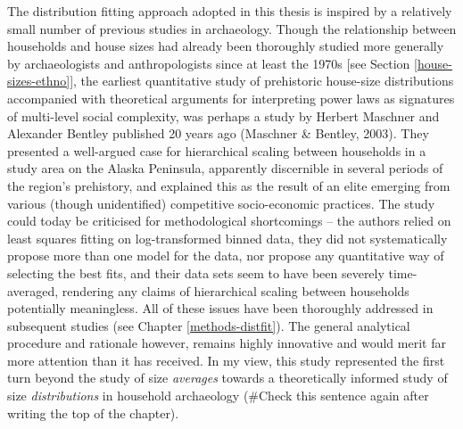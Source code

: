\documentclass[
  12pt,
]{book}
\begin{document}
The distribution fitting approach adopted in this thesis is inspired by a relatively small number of previous studies in archaeology. Though the relationship between households and house sizes had already been thoroughly studied more generally by archaeologists and anthropologists since at least the 1970s {[}see Section \ref{house-sizes-ethno}{]}, the earliest quantitative study of prehistoric house-size distributions accompanied with theoretical arguments for interpreting power laws as signatures of multi-level social complexity, was perhaps a study by Herbert Maschner and Alexander Bentley published 20 years ago (Maschner \& Bentley, 2003). They presented a well-argued case for hierarchical scaling between households in a study area on the Alaska Peninsula, apparently discernible in several periods of the region's prehistory, and explained this as the result of an elite emerging from various (though unidentified) competitive socio-economic practices. The study could today be criticised for methodological shortcomings -- the authors relied on least squares fitting on log-transformed binned data, they did not systematically propose more than one model for the data, nor propose any quantitative way of selecting the best fits, and their data sets seem to have been severely time-averaged, rendering any claims of hierarchical scaling between households potentially meaningless. All of these issues have been thoroughly addressed in subsequent studies (see Chapter \ref{methods-distfit}). The general analytical procedure and rationale however, remains highly innovative and would merit far more attention than it has received. In my view, this study represented the first turn beyond the study of size \emph{averages} towards a theoretically informed study of size \emph{distributions} in household archaeology (\#Check this sentence again after writing the top of the chapter).
\end{document}
